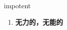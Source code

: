 
\begin{frame}
{\huge impotent}
\begin{center}
\begin{enumerate}\Large
  \item \textbf{无力的，无能的}
\end{enumerate}
\end{center}
\end{frame}
